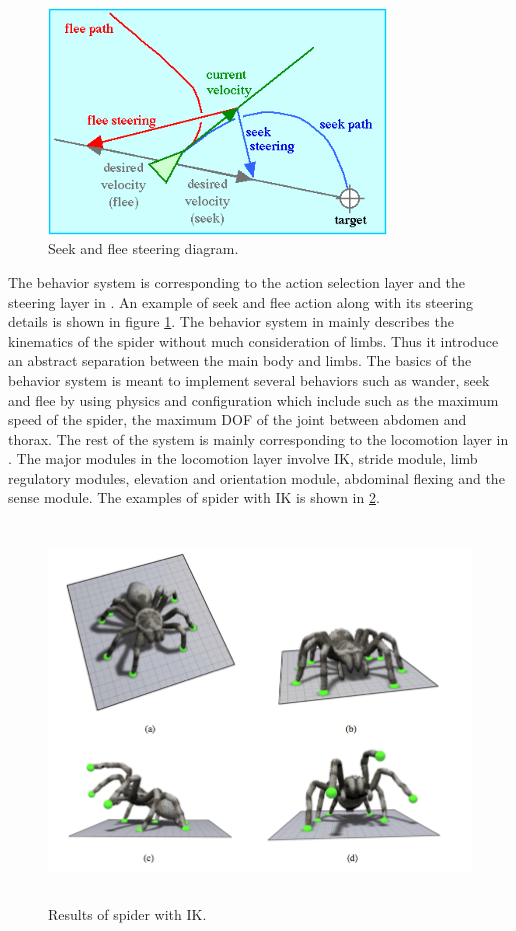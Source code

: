\begin{figure}[ht!]
\centering
\includegraphics[height=6cm]{figures/seek.png}
\caption{Seek and flee steering diagram. \protect\cite{steeringImage}}
\label{fig:seek}
\end{figure}
The behavior system is corresponding to the action selection layer and the steering layer in \cite{steering}. An example of seek and flee action along with its steering details is shown in figure \ref{fig:seek}. The behavior system in \cite{thesis} mainly describes the kinematics of the spider without much consideration of limbs. Thus it introduce an abstract separation between the main body and limbs. The basics of the behavior system is meant to implement several behaviors such as wander, seek and flee by using physics and configuration which include such as the maximum speed of the spider, the maximum DOF of the joint between abdomen and thorax.
The rest of the system is mainly corresponding to the locomotion layer in \cite{steering}.
The major modules in the locomotion layer involve IK, stride module, limb regulatory modules, elevation and orientation module, abdominal flexing and the sense module. The examples of spider with IK is shown in \ref{fig:spiderIK}.
\begin{figure}[ht!]
\centering
\includegraphics[height=10cm]{figures/spiderIK.png}
\caption{Results of spider with IK. \protect\cite{thesis}}
\label{fig:spiderIK}
\end{figure}
